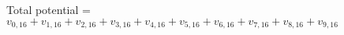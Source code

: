 \documentclass[preview]{standalone}
\begin{document}
\begin{center}
Total potential = $v_{0,16} + v_{1,16} + v_{2,16} + v_{3,16} + v_{4,16} + v_{5,16} + v_{6,16} + v_{7,16} + v_{8,16} + v_{9,16}$
\end{center}
\end{document}
